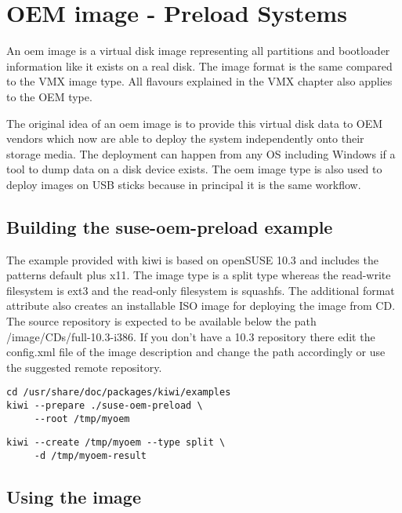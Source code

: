 \chapter{OEM image - Preload Systems}
\label{chapter:oem}
\minitoc

An oem image is a virtual disk image representing all partitions
and bootloader information like it exists on a real disk. The image
format is the same compared to the VMX image type. All flavours
explained in the VMX chapter also applies to the OEM type.

The original idea of an oem image is to provide this virtual disk data
to OEM vendors which now are able to deploy the system independently onto
their storage media. The deployment can happen from any OS including
Windows if a tool to dump data on a disk device exists. The oem image
type is also used to deploy images on USB sticks because in principal
it is the same workflow.

\section{Building the suse-oem-preload example}

The example provided with kiwi is based on openSUSE 10.3 and includes
the patterns default plus x11. The image type is a split type whereas
the read-write filesystem is ext3 and the read-only filesystem is
squashfs. The additional format attribute also creates an installable
ISO image for deploying the image from CD. The source repository is expected
to be available below the path /image/CDs/full-10.3-i386. If you don't have
a 10.3 repository there edit the config.xml file of the image description
and change the path accordingly or use the suggested remote repository.

\begin{Command}{12cm}
\begin{verbatim}
cd /usr/share/doc/packages/kiwi/examples
kiwi --prepare ./suse-oem-preload \
     --root /tmp/myoem
\end{verbatim}
\end{Command}

\begin{Command}{12cm}
\begin{verbatim}
kiwi --create /tmp/myoem --type split \
     -d /tmp/myoem-result
\end{verbatim}
\end{Command}

\section{Using the image}

